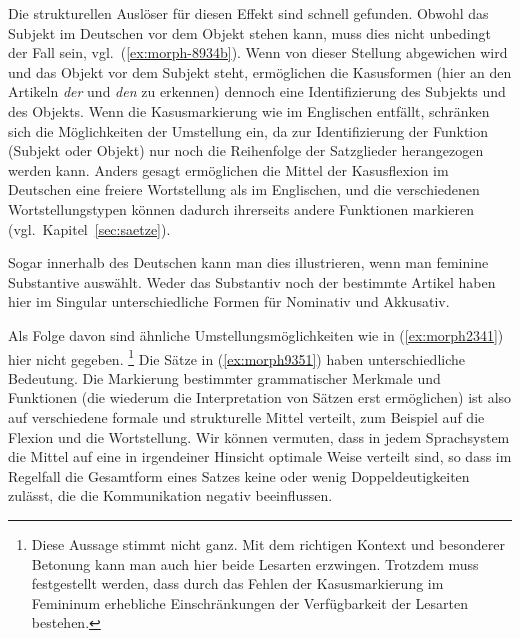 Die strukturellen Auslöser für diesen Effekt sind schnell gefunden.
Obwohl das Subjekt im Deutschen vor dem Objekt stehen kann, muss dies nicht unbedingt der Fall sein, vgl.\ (\ref{ex:morph-8934b}).
Wenn von dieser Stellung abgewichen wird und das Objekt vor dem Subjekt steht, ermöglichen die Kasusformen (hier an den Artikeln \textit{der} und \textit{den} zu erkennen) dennoch eine Identifizierung des Subjekts und des Objekts.
Wenn die Kasusmarkierung wie im Englischen entfällt, schränken sich die Möglichkeiten der Umstellung ein, da zur Identifizierung der Funktion (Subjekt oder Objekt) nur noch die Reihenfolge der Satzglieder herangezogen werden kann.
Anders gesagt ermöglichen die Mittel der Kasusflexion im Deutschen eine freiere Wortstellung als im Englischen, und die verschiedenen Wortstellungstypen können dadurch ihrerseits andere Funktionen markieren (vgl.\ Kapitel~\ref{sec:saetze}).

Sogar innerhalb des Deutschen kann man dies illustrieren, wenn man \zB feminine Substantive auswählt.
Weder das Substantiv noch der bestimmte Artikel haben hier im Singular unterschiedliche Formen für Nominativ und Akkusativ.

\begin{exe}
  \ex \label{ex:morph9351}
  \begin{xlist}
  \end{xlist}
\end{exe}

Als Folge davon sind ähnliche Umstellungsmöglichkeiten wie in (\ref{ex:morph2341}) hier nicht gegeben.%
\footnote{Diese Aussage stimmt nicht ganz.
Mit dem richtigen Kontext und besonderer Betonung kann man auch hier beide Lesarten erzwingen.
Trotzdem muss festgestellt werden, dass durch das Fehlen der Kasusmarkierung im Femininum erhebliche Einschränkungen der Verfügbarkeit der Lesarten bestehen.}
Die Sätze in (\ref{ex:morph9351}) haben unterschiedliche Bedeutung.
Die Markierung bestimmter grammatischer Merkmale und Funktionen (die wiederum die Interpretation von Sätzen erst ermöglichen) ist also auf verschiedene formale und strukturelle Mittel verteilt, zum Beispiel auf die Flexion und die Wortstellung.
Wir können vermuten, dass in jedem Sprachsystem die Mittel auf eine in irgendeiner Hinsicht optimale Weise verteilt sind, so dass im Regelfall die Gesamtform eines Satzes keine oder wenig Doppeldeutigkeiten zulässt, die die Kommunikation negativ beeinflussen.

